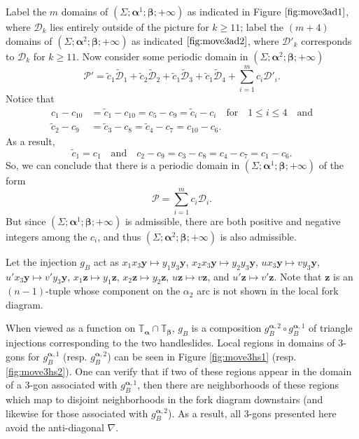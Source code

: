 \documentclass[11pt]{article}
\theoremstyle{plain} \newtheorem{thm}{Theorem}[subsection]
\theoremstyle{plain} \newtheorem{cor}[thm]{Corollary}
\theoremstyle{plain} \newtheorem{prop}[thm]{Proposition}
\theoremstyle{plain} \newtheorem{conj}[thm]{Conjecture}
\theoremstyle{plain} \newtheorem{lem}[thm]{Lemma}
\theoremstyle{definition} \newtheorem{df}[thm]{Definition}
\theoremstyle{remark} \newtheorem{rmk}[thm]{Remark}
\theoremstyle{remark} \newtheorem{obs}[thm]{Observation}
\newcommand{\tld}[1]{\widetilde{#1}}
\newcommand{\ba}{\boldsymbol{\alpha}}
\newcommand{\bb}{\boldsymbol{\beta}}
\newcommand{\Ta}{\mathbb{T}_{\ba}}
\newcommand{\Tb}{\mathbb{T}_{\bb}}
\newcommand{\by}{\mathbf{y}}
\newcommand{\bz}{\mathbf{z}}
\newcommand{\AD}{\nabla}
\begin{document}
Label the $m$ domains of $\left( \Sigma; \ba^1; \bb; +\infty \right)$ as indicated in Figure $\ref{fig:move3ad1}$, where $\mathcal{D}_{k}$ lies entirely outside of the picture for $k \geq 11$; label the $(m + 4)$ domains of $\left( \Sigma; \ba^2; \bb; +\infty \right)$ as indicated $\ref{fig:move3ad2}$, where $\mathcal{D}'_k$ corresponds to $\mathcal{D}_k$ for $k \geq 11.$  Now consider some periodic domain in $\left( \Sigma; \ba^2; \bb; +\infty \right)$
$$\mathcal{P}' = \tld{c}_1\tld{\mathcal{D}}_1 + \tld{c}_2\tld{\mathcal{D}}_2 + \tld{c}_1\tld{\mathcal{D}}_3 + \tld{c}_1\tld{\mathcal{D}}_4 + \sum_{i=1}^{m} c_i\mathcal{D}'_i.$$
Notice that
\begin{align*}
c_1 - c_{10} &= \tld{c}_1 - c_{10} = c_5 - c_9 = \tld{c}_{i} - c_i \quad \text{for} \quad 1 \leq i \leq 4 \quad \text{and}\\
\tld{c}_2 - c_9 &= \tld{c}_3 - c_8 =\tld{c}_4 - c_7 =c_{10} - c_6.
\end{align*}
As a result,
$$ \tld{c}_1 = c_1 \quad \text{and} \quad c_2 - c_9 = c_3 - c_8 = c_4 - c_7 = c_1 - c_6.$$
So, we can conclude that there is a periodic domain in $\left( \Sigma; \ba^1; \bb; +\infty \right)$ of the form
$$\mathcal{P} = \sum_{i=1}^{m} c_i\mathcal{D}_i.$$
But since $\left( \Sigma; \ba^1; \bb; +\infty \right)$ is admissible, there are both positive and negative integers among the $c_i$, and thus $\left( \Sigma; \ba^2; \bb; +\infty \right)$ is also admissible.

Let the injection $g_{B}$ act as $x_{1} x_{3} \by \mapsto y_{1}  y_{3} \by$, $x_{2} x_{3} \by \mapsto y_{2}  y_{3} \by$, $u  x_{3} \by \mapsto v  y_{3} \by$, $u' x_{3} \by \mapsto v'  y_{3} \by$, $x_{1} \bz \mapsto y_{1} \bz$, $x_{2} \bz \mapsto y_{2} \bz$, $u \bz \mapsto v \bz$, and $u' \bz \mapsto v' \bz$.  Note that $\bz $ is an $(n-1)$-tuple whose component on the $\alpha_{2}$ arc is not shown in the local fork diagram.

When viewed as a function on $\Ta \cap \Tb$, $g_{B}$ is a composition $g_{B}^{\ba,2} \circ g_{B}^{\ba,1}$ of triangle injections corresponding to the two handleslides.  Local regions in domains of 3-gons for $g_{B}^{\ba,1}$ (resp. $g_{B}^{\ba,2}$) can be seen in Figure \ref{fig:move3hs1} (resp. \ref{fig:move3hs2}).  One can verify that if two of these regions appear in the domain of a 3-gon associated with $g_{B}^{\ba,1}$, then there are neighborhoods of these regions which map to disjoint neighborhoods in the fork diagram downstairs (and likewise for those associated with $g_{B}^{\ba,2}$).  As a result, all 3-gons presented here avoid the anti-diagonal $\AD$.
\end{document}
